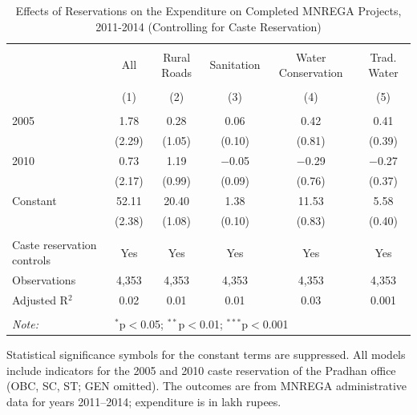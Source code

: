 \begin{table}[!htbp]
\centering
\begin{threeparttable}

  \caption{Effects of Reservations on the Expenditure on Completed MNREGA Projects, 2011-2014 (Controlling for Caste Reservation)} 
  \label{main_mnrega_expenditure_caste_ctrl} 
\scriptsize 
\begin{tabular}{@{\extracolsep{0pt}}lccccc} 
\\[-1.8ex]\hline 
\hline \\[-1.8ex] 
 & All & Rural Roads & Sanitation & Water Conservation & Trad. Water \\ 
\\[-1.8ex] & (1) & (2) & (3) & (4) & (5)\\ 
\hline \\[-1.8ex] 
 2005 & 1.78 & 0.28 & 0.06 & 0.42 & 0.41 \\ 
  & (2.29) & (1.05) & (0.10) & (0.81) & (0.39) \\ 
  2010 & 0.73 & 1.19 & $-$0.05 & $-$0.29 & $-$0.27 \\ 
  & (2.17) & (0.99) & (0.09) & (0.76) & (0.37) \\ 
  Constant & 52.11 & 20.40 & 1.38 & 11.53 & 5.58 \\ 
  & (2.38) & (1.08) & (0.10) & (0.83) & (0.40) \\ 
 \hline \\[-1.8ex] 
Caste reservation controls & Yes & Yes & Yes & Yes & Yes \\ 
Observations & 4,353 & 4,353 & 4,353 & 4,353 & 4,353 \\ 
Adjusted R$^{2}$ & 0.02 & 0.01 & 0.01 & 0.03 & 0.001 \\ 
\hline 
\hline \\[-1.8ex] 
\textit{Note:}  & \multicolumn{5}{l}{$^{*}$p$<$0.05; $^{**}$p$<$0.01; $^{***}$p$<$0.001} \\ 
\end{tabular} 
\begin{tablenotes}[flushleft]
\scriptsize
\item[] Statistical significance symbols for the constant terms are suppressed. All models include indicators for the 2005 and 2010 caste reservation of the Pradhan office (OBC, SC, ST; GEN omitted). The outcomes are from MNREGA administrative data for years 2011--2014; expenditure is in lakh rupees.
\end{tablenotes}
\end{threeparttable}
\end{table}
